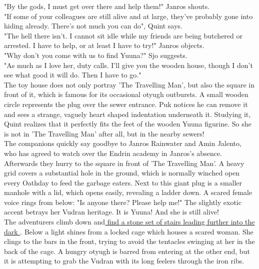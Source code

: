 "By the gods, I must get over there and help them!" Janros shouts.\\

"If some of your colleagues are still alive and at large, they've probably gone into hiding already. There's not much you can do", Quint says.\\

"The hell there isn't. I cannot sit idle while my friends are being butchered or arrested. I have to help, or at least I have to try!" Janros objects.\\

"Why don't you come with us to find Yuuna?" Sjo suggests.\\

"As much as I love her, duty calls. I'll give you the wooden house, though I don't see what good it will do. Then I have to go."\\

The toy house does not only portray 'The Travelling Man', but also the square in front of it, which is famous for its occasional otyugh outbursts. A small wooden circle represents the plug over the sewer entrance. Puk notices he can remove it and sees a strange, vaguely heart shaped indentation underneath it. Studying it, Quint realizes that it perfectly fits the feet of the wooden Yuuna figurine. So she is not in 'The Travelling Man' after all, but in the nearby sewers!\\

The companions quickly say goodbye to Janros Rainwater and Amin Jalento, who has agreed to watch over the Endrin academy in Janros's absence. Afterwards they hurry to the square in front of 'The Travelling Man'. A heavy grid covers a substantial hole in the ground, which is normally winched open every Oathday to feed the garbage eaters. Next to this giant plug is a smaller manhole with a lid, which opens easily, revealing a ladder down. A scared female voice rings from below: "Is anyone there? Please help me!" The slightly exotic accent betrays her Vudran heritage. It is Yuuna! And she is still alive!\\

The adventurers climb down and\hyperref[fig:Otyugh-sewer-pit-Korvosa-550449437]{ find a stone set of stairs leading further into the dark } . Below a light shines from a locked cage which houses a scared woman. She clings to the bars in the front, trying to avoid the tentacles swinging at her in the back of the cage. A hungry otyugh is barred from entering at the other end, but it is attempting to grab the Vudran with its long feelers through the iron ribs. \\

